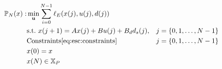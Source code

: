 \begin{alignat}{2}
\label{eq:esc:PbT}
\mathbb{P}_N(x):& \min_{\mathbf{u}}
{\sum_{i=0}^{N-1}\ell_E(x(j),u(j),d(j))}& \nonumber \\
&\text{s.t.~} x(j+1) = Ax(j) + Bu(j)+B_dd_s(j),&j = \left\lbrace 0,1,\ldots,N-1 \right\rbrace\\\
& \text{Constraints}\eqref{eq:esc:constraints}&j = \left\lbrace 0,1,\ldots,N-1 \right\rbrace \nonumber\\
& x(0) = x \nonumber\\
& x(N) \in \mathbb{X}_P
\end{alignat}







